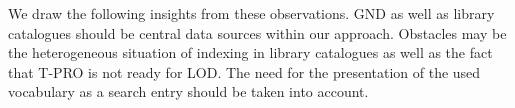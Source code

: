 We draw the following insights from these observations.
\gls{GND} as well as library catalogues should be central data sources within our approach.
Obstacles may be
the heterogeneous situation of indexing in library catalogues
as well as the fact that T-PRO is not ready for LOD.
The need for the presentation of the used vocabulary as a search entry
should be taken into account.

%
%

